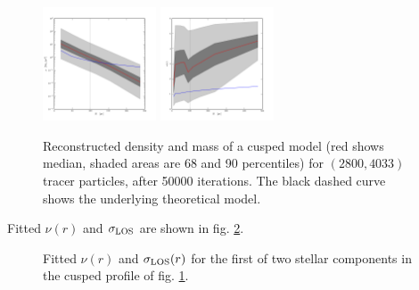 \begin{figure}
\begin{center}
\hspace{-7mm}
\includegraphics[width=0.3\textwidth]{fig/prof_dens.png}
\includegraphics[width=0.3\textwidth]{fig/prof_nr.png}

\caption{Reconstructed density and mass of a cusped model (red shows median,
  shaded areas are 68 and 90 percentiles) for $(2800,4033)$ tracer particles,
  after 50000 iterations. The black dashed curve shows the underlying
  theoretical model.}
\label{fig:cusp}
\end{center}
\end{figure}




Fitted $\nu(r)$ and $\sigma_{\text{LOS}}$ are shown in fig. \ref{fig:nusiglos}.

\begin{figure}
\begin{center}
    \hspace{-7mm}
    \caption{\label{fig:nusiglos} Fitted $\nu(r)$ and $\sigma_{\text{LOS}}(r)$ for the
      first of two stellar components in the cusped profile of
      fig. \ref{fig:cusp}.}

\end{center}
\end{figure}


